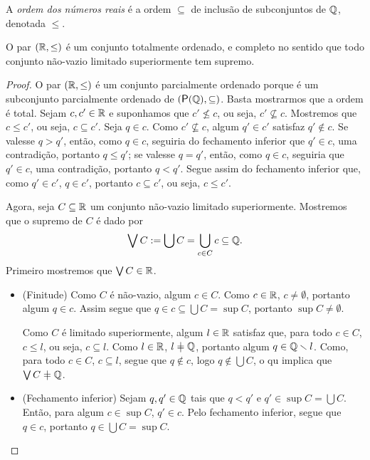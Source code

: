\begin{definition}
A \emph{ordem dos números reais} é a ordem $\subseteq$ de inclusão de subconjuntos de $\mathbb{Q}$, denotada $\leq$.
\end{definition}

\begin{proposition}
O par $(\mathbb{R},\leq)$ é um conjunto totalmente ordenado, e completo no sentido que todo conjunto não-vazio limitado superiormente tem supremo.
\end{proposition}
\begin{proof}
O par $(\mathbb{R},\leq)$ é um conjunto parcialmente ordenado porque é um subconjunto parcialmente ordenado de $(\p(\Q),\subseteq)$. Basta mostrarmos que a ordem é total. Sejam $c,c' \in \mathbb{R}$ e suponhamos que $c' \nleq c$, ou seja, $c' \nsubseteq c$. Mostremos que $c \leq c'$, ou seja, $c \subseteq c'$. Seja $q \in c$. Como $c' \nsubseteq c$, algum $q' \in c'$ satisfaz $q' \notin c$. Se valesse $q > q'$, então, como $q \in c$, seguiria do fechamento inferior que $q' \in c$, uma contradição, portanto $q \leq q'$; se valesse $q = q'$, então, como $q \in c$, seguiria que $q' \in c$, uma contradição, portanto $q < q'$. Segue assim do fechamento inferior que, como $q' \in c'$, $q \in c'$, portanto $c \subseteq c'$, ou seja, $c \leq c'$.

Agora, seja $C \subseteq \mathbb{R}$ um conjunto não-vazio limitado superiormente. Mostremos que o supremo de $C$ é dado por
	\begin{equation*}
	\bigvee C := \bigcup C = \bigcup_{c \in C} c \subseteq \mathbb{Q}.
	\end{equation*}
Primeiro mostremos que $\bigvee C \in \mathbb{R}$.
	\begin{itemize}
	\item (Finitude) Como $C$ é não-vazio, algum $c \in C$. Como $c \in \mathbb{R}$, $c \neq \emptyset$, portanto algum $q \in c$. Assim segue que $q \in c \subseteq \bigcup C = \sup C$, portanto $\sup C \neq \emptyset$.
	
	Como $C$ é limitado superiormente, algum $l \in \mathbb{R}$ satisfaz que, para todo $c \in C$, $c \leq l$, ou seja, $c \subseteq l$. Como $l \in \mathbb{R}$, $l \neq \Q$, portanto algum $q \in \mathbb{Q} \smallsetminus l$. Como, para todo $c \in C$, $c \subseteq l$, segue que $q \notin c$, logo $q \notin \bigcup C$, o qu implica que $\sup C \neq \Q$.

	\item (Fechamento inferior) Sejam $q,q' \in \mathbb{Q}$ tais que $q < q'$ e $q' \in \sup C = \bigcup C$. Então, para algum $c \in \sup C$, $q' \in c$. Pelo fechamento inferior, segue que $q \in c$, portanto $q \in \bigcup C = \sup C$.


\end{itemize}
\end{proof}

